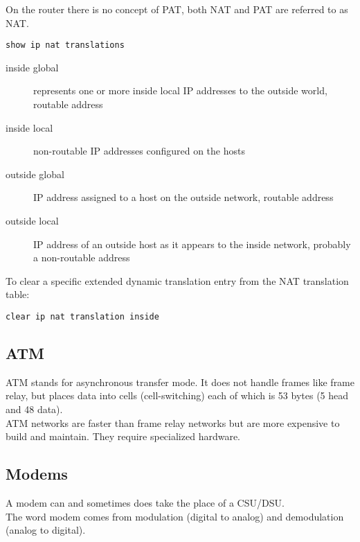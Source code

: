 On the router there is no concept of PAT, both NAT and PAT are referred to
as NAT.

\begin{verbatim}
show ip nat translations
\end{verbatim}

\begin{description}

\item[inside global]
represents one or more inside local IP addresses to the outside world, routable
address

\item[inside local]
non-routable IP addresses configured on the hosts

\item[outside global]
IP address assigned to a host on the outside network, routable address

\item[outside local]
IP address of an outside host as it appears to the inside network, probably
a non-routable address

\end{description}

To clear a specific extended dynamic translation entry from the NAT translation
table:\\

\begin{verbatim}
clear ip nat translation inside
\end{verbatim}

\subsection{ATM}

ATM stands for asynchronous transfer mode. It does not handle frames like
frame relay, but places data into cells (cell-switching) each of which is 53
bytes (5 head and 48 data).\\

ATM networks are faster than frame relay networks but are more expensive to
build and maintain. They require specialized hardware.

\subsection{Modems}

A modem can and sometimes does take the place of a CSU/DSU.\\

The word modem comes from modulation (digital to analog) and demodulation
(analog to digital).\\

